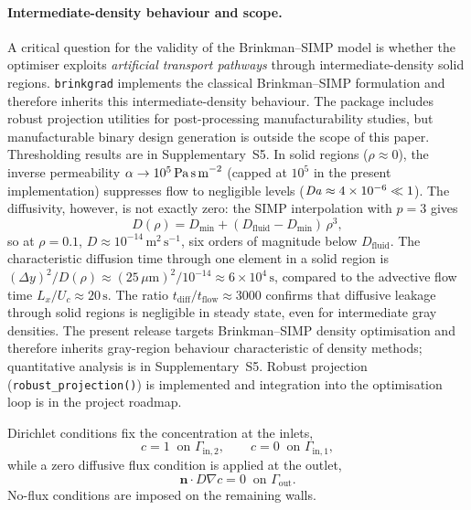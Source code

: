 \paragraph{Intermediate-density behaviour and scope.}
\label{para:leakage}
A critical question for the validity of the Brinkman--SIMP model is
whether the optimiser exploits \emph{artificial transport pathways}
through intermediate-density solid regions.
\texttt{brinkgrad} implements the classical Brinkman--SIMP formulation
and therefore inherits this intermediate-density behaviour.
The package includes robust projection utilities for post-processing
manufacturability studies, but manufacturable binary design generation
is outside the scope of this paper.
Thresholding results are in Supplementary~S5.
In solid regions ($\rho \approx 0$), the inverse permeability
$\alpha \to 10^{5}\,\text{Pa\,s\,m}^{-2}$ (capped at $10^5$ in the present implementation) suppresses flow to
negligible levels ($\mathit{Da} \approx 4\times10^{-6} \ll 1$).
The diffusivity, however, is not exactly zero: the SIMP interpolation
with $p=3$ gives
\[
  D(\rho) = D_{\min} + (D_{\text{fluid}} - D_{\min})\,\rho^3,
\]
so at $\rho = 0.1$, $D \approx 10^{-14}\,\text{m}^2\,\text{s}^{-1}$,
six orders of magnitude below $D_{\text{fluid}}$.
The characteristic diffusion time through one element in a solid region
is $({\Delta y})^2/D(\rho) \approx (25\,\mu\text{m})^2/10^{-14}
\approx 6\times10^4\,\text{s}$, compared to the advective flow time
$L_x/U_c \approx 20\,\text{s}$.
The ratio $t_{\mathrm{diff}}/t_{\mathrm{flow}} \approx 3000$
confirms that diffusive leakage through solid regions is negligible in
steady state, even for intermediate gray densities.
The present release targets Brinkman--SIMP density optimisation
and therefore inherits gray-region behaviour characteristic of
density methods; quantitative analysis is in Supplementary~S5.
Robust projection (\texttt{robust\_projection()}) is implemented
and integration into the optimisation loop is in the project roadmap.


Dirichlet conditions fix the concentration at the inlets,
\begin{equation}
    c = 1 \;\; \text{on } \Gamma_{\text{in},2}, \qquad c = 0 \;\; \text{on } \Gamma_{\text{in},1},
\end{equation}
while a zero diffusive flux condition is applied at the outlet,
\begin{equation}
    \mathbf{n}\cdot D\nabla c = 0 \;\; \text{on } \Gamma_{\text{out}}.
\end{equation}
No-flux conditions are imposed on the remaining walls.


